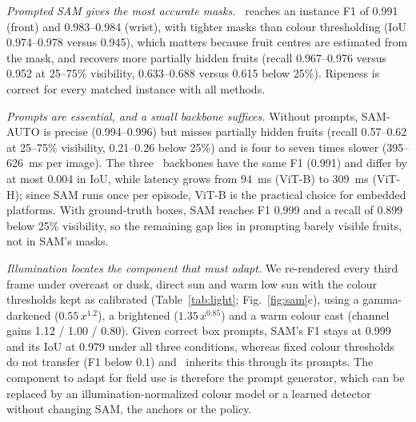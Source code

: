 \emph{Prompted SAM gives the most accurate masks.} \fdm\ reaches an instance F1 of 0.991 (front) and 0.983--0.984 (wrist), with tighter masks than colour thresholding (IoU 0.974--0.978 versus 0.945), which matters because fruit centres are estimated from the mask, and recovers more partially hidden fruits (recall 0.967--0.976 versus 0.952 at 25--75\% visibility, 0.633--0.688 versus 0.615 below 25\%). Ripeness is correct for every matched instance with all methods.

\emph{Prompts are essential, and a small backbone suffices.} Without prompts, SAM-AUTO is precise (0.994--0.996) but misses partially hidden fruits (recall 0.57--0.62 at 25--75\% visibility, 0.21--0.26 below 25\%) and is four to seven times slower (395--626~ms per image). The three \fdm\ backbones have the same F1 (0.991) and differ by at most 0.004 in IoU, while latency grows from 94~ms (ViT-B) to 309~ms (ViT-H); since SAM runs once per episode, ViT-B is the practical choice for embedded platforms. With ground-truth boxes, SAM reaches F1 0.999 and a recall of 0.899 below 25\% visibility, so the remaining gap lies in prompting barely visible fruits, not in SAM's masks.

\emph{Illumination locates the component that must adapt.} We re-rendered every third frame under overcast or dusk, direct sun and warm low sun with the colour thresholds kept as calibrated (Table~\ref{tab:light}; Fig.~\ref{fig:sam}c), using a gamma-darkened ($0.55\,x^{1.2}$), a brightened ($1.35\,x^{0.85}$) and a warm colour cast (channel gains 1.12 / 1.00 / 0.80). Given correct box prompts, SAM's F1 stays at 0.999 and its IoU at 0.979 under all three conditions, whereas fixed colour thresholds do not transfer (F1 below 0.1) and \fdm\ inherits this through its prompts. The component to adapt for field use is therefore the prompt generator, which can be replaced by an illumination-normalized colour model or a learned detector without changing SAM, the anchors or the policy. 

